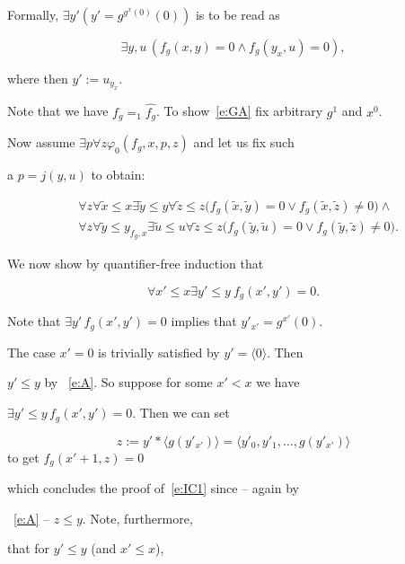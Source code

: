 \documentclass[1p]{elsarticle}
\newcommand{\be}[1][{e:\arabic{equation}}] { \begin{equation}\label{#1} }
\newcommand{\ee} { \end{equation} }
\theoremstyle{plain}
\theoremstyle{definition}
\theoremstyle{remark}
\renewenvironment{proof}[1][]{\noindent{\bf Proof{#1}. }}{\nopagebreak[4]{\hspace*{\fill}


  $\Box$              %

 }{\vspace{2ex}}}
\renewcommand{\phi}{\varphi}
\theoremstyle{definition}
\begin{document}
{\begin{proof}
Formally, $\exists y' (y'=g^{g^x(0)}(0))$ is to be read as 

\[ \exists y,u \, (f_g(x,y)=0\wedge f_g(y_x,u)=0),

\tag{GA$^*$}\label{e:GA$^*$} \] 

where then $y':=u_{y_x}.$  

Note that we have $f_g=_1\widehat{f_g}$. To show~\eqref{e:GA} fix arbitrary $g^1$ and $x^0$.

Now assume $\exists p\forall z\phi_0(f_g,x,p,z)$ and let us fix such 

a $p=j(y,u)$ to obtain:

\begin{align}

&\forall z\forall\tilde x \leq x \exists \tilde y\leq y \forall \tilde z\leq z 

\big(f_g(\tilde x,\tilde y)=0\vee f_g(\tilde x,\tilde z)\neq0\big) \label{e:A}

\wedge \\

&\forall z\forall\tilde y \leq y_{f_g,x} \exists \tilde u\leq u \forall \tilde z\leq z 

\big(f_g(\tilde y,\tilde u)=0\vee f_g(\tilde y,\tilde z)\neq0\big). \label {e:B}

\end{align}

We now show by quantifier-free induction that 

\be[e:IC1]

\forall x'\leq x \exists y'\leq y\ f_g(x',y')=0.

\ee

Note that $\exists y'\,f_g(x',y')=0$ implies that $y'_{x'}=g^{x'}(0).$ 

The case $x'=0$ is trivially satisfied by $y'=\langle 0 \rangle$. Then 

$y'\le y$ by ~\eqref{e:A}. So suppose for some $x'<x$ we have

$\exists y'\leq y\,f_g(x',y')=0.$ Then we can set 

\[

z:=y'*\langle g(y'_{x'}) \rangle =\langle y'_0,y'_1,\ldots,g(y'_{x'})\rangle

\] to get $f_g(x'+1,z)=0$

which concludes the proof of~\eqref{e:IC1} since -- again by 

~\eqref{e:A} -- $z\le y.$ Note, furthermore,

that for $y'\leq y$ (and $x'\leq x$),


\end{proof}}
\end{document}
